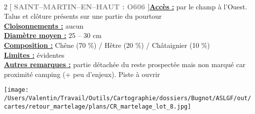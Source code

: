 \documentclass[a4paper,openany]{book}\usepackage[]{graphicx}\usepackage[]{color}
\begin{document}
\\\begin{multicols}{2}
[
\textbf{\textcolor{gray}{
\large SAINT--MARTIN--EN--HAUT : O606
}}
]\noindent\textbf{\underline{Accès :}} par le champ à l'Ouest. Talus et clôture présents sur une partie du pourtour\vspace{0.1cm} \\\noindent\textbf{\underline{Cloisonnements :}} aucun\vspace{0.1cm} \\\noindent\textbf{\underline{Diamètre moyen :}} 25 -- 30 cm\vspace{0.1cm} \\\noindent\textbf{\underline{Composition :}} Chêne (70 \%) / Hêtre (20 \%) / Châtaignier (10 \%)\vspace{0.1cm} \\\noindent\textbf{\underline{Limites :}} évidentes\vspace{0.1cm} \\\noindent\textbf{\underline{Autres remarques :}} partie détachée du reste prospectée mais non marqué car proximité camping (+ peu d'enjeux). Piste à ouvrir\vspace{0.1cm} \\\end{multicols}\begin{center}
\texttt{[image: /Users/Valentin/Travail/Outils/Cartographie/dossiers/Bugnot/ASLGF/out/cartes/retour\_martelage/plans/CR\_martelage\_lot\_8.jpg]}
\end{center}\newpage\noindent
\end{document}
